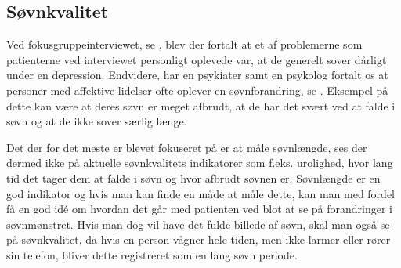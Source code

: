 \subsection{Søvnkvalitet}
Ved fokusgruppeinterviewet, se \citep[Kapitel 1, Sektion 5]{misc:faellesrapp}, blev der fortalt at et af problemerne som patienterne ved interviewet personligt oplevede var, at de generelt sover dårligt under en depression.
Endvidere, har en psykiater samt en psykolog fortalt os at personer med affektive lidelser ofte oplever en søvnforandring, se \citep[Kapitel 1, Sektion 3 og 4]{misc:faellesrapp}.
Eksempel på dette kan være at deres søvn er meget afbrudt, at de har det svært ved at falde i søvn og at de ikke sover særlig længe.

Det der for det meste er blevet fokuseret på er at måle søvnlængde, ses der dermed ikke på aktuelle søvnkvalitets indikatorer som f.eks. urolighed, hvor lang tid det tager dem at falde i søvn og hvor afbrudt søvnen er.
Søvnlængde er en god indikator og hvis man kan finde en måde at måle dette, kan man med fordel få en god idé om hvordan det går med patienten ved blot at se på forandringer i søvnmønstret. 
Hvis man dog vil have det fulde billede af søvn, skal man også se på søvnkvalitet, da hvis en person vågner hele tiden, men ikke larmer eller rører sin telefon, bliver dette registreret som en lang søvn periode.